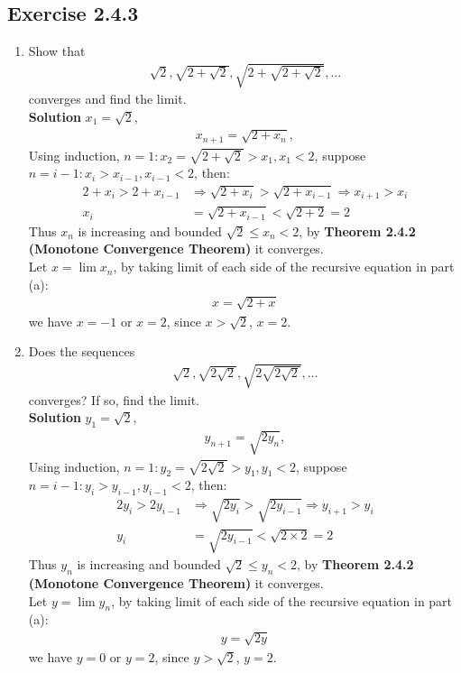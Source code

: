 \documentclass[12pt]{report}
\begin{document}
\subsection*{Exercise 2.4.3}
\begin{enumerate}[label=(\alph*)]
    \item Show that
    \begin{align*}
        \sqrt{2},\sqrt{2+\sqrt{2}},\sqrt{2+\sqrt{2+\sqrt{2}}},\ldots
    \end{align*}
    converges and find the limit.\\
    \textbf{Solution} $x_1 = \sqrt2$,
    \begin{align*}
         x_{n+1} = \sqrt{2+x_n},
    \end{align*}
    Using induction, $n=1: x_2 = \sqrt{2+\sqrt{2}} >x_1, x_1 <2$, suppose $n=i-1: x_i > x_{i-1}, x_{i-1}<2$, then:
    \begin{align*}
        2+x_i > 2+x_{i-1} &\Rightarrow \sqrt{2+x_i} > \sqrt{2+x_{i-1}} \Rightarrow x_{i+1} > x_i\\
        x_i &= \sqrt{2+x_{i-1}} < \sqrt{2+2} = 2
    \end{align*}
    Thus $x_n$ is increasing and bounded $\sqrt2 \leq x_n <2$, by \textbf{Theorem 2.4.2 (Monotone Convergence Theorem)} it converges.\\
    Let $x = \lim x_n$, by taking limit of each side of the recursive equation in part (a):
    \begin{align*}
        x = \sqrt{2+x}
    \end{align*}
    we have $x=-1$ or $x=2$, since $x>\sqrt2$, $x=2$.
    \item Does the sequences
    \begin{align*}
        \sqrt{2},\sqrt{2\sqrt{2}},\sqrt{2\sqrt{2\sqrt{2}}},\ldots
    \end{align*}
    converges? If so, find the limit.\\
    \textbf{Solution} $y_1 = \sqrt2$,
    \begin{align*}
         y_{n+1} = \sqrt{2y_n},
    \end{align*}
    Using induction, $n=1: y_2 = \sqrt{2\sqrt{2}} >y_1, y_1 <2$, suppose $n=i-1: y_i > y_{i-1}, y_{i-1}<2$, then:
    \begin{align*}
        2y_i > 2y_{i-1} &\Rightarrow \sqrt{2y_i} > \sqrt{2y_{i-1}} \Rightarrow y_{i+1} > y_i\\
        y_i &= \sqrt{2y_{i-1}} < \sqrt{2\times2} = 2
    \end{align*}
    Thus $y_n$ is increasing and bounded $\sqrt2 \leq y_n <2$, by \textbf{Theorem 2.4.2 (Monotone Convergence Theorem)} it converges.\\
    Let $y = \lim y_n$, by taking limit of each side of the recursive equation in part (a):
    \begin{align*}
        y = \sqrt{2y}
    \end{align*}
    we have $y=0$ or $y=2$, since $y>\sqrt2$, $y=2$.
\end{enumerate}
\end{document}
